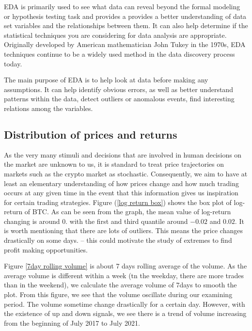 \documentclass[twoside]{report}
\begin{document}
\begin{spacing}{1}
EDA is primarily used to see what data can reveal beyond the formal modeling or hypothesis testing task and provides a provides a better understanding of data set variables and the relationships between them. It can also help determine if the statistical techniques you are considering for data analysis are appropriate. Originally developed by American mathematician John Tukey in the 1970s, EDA techniques continue to be a widely used method in the data discovery process today.

The main purpose of EDA is to help look at data before making any assumptions. It can help identify obvious errors, as well as better understand patterns within the data, detect outliers or anomalous events, find interesting relations among the variables.



\subsection{Distribution of prices and returns}

As the very many stimuli and decisions that are involved in human decisions on the market are unknown to us, it is standard to treat price trajectories on markets such as the crypto market as stochastic. Consequently, we aim to have at least an elementary understanding of how prices change and how much trading occurs at any given time in the event that this information gives us inspiration for certain trading strategies. Figure (\ref{log return box}) shows the box plot of log-return of BTC. As can be seen from the graph, the mean value of log-return changing is around 0. with the first and third quantile around $-0.02$ and $0.02$. It is worth mentioning that there are lots of outliers. This means the price changes drastically on some days. -- this could motivate the study of extremes to find profit making opportunities. 

Figure \ref{7day rolling volume} is about 7 days rolling average of the volume. As the average volume is different within a week (tn the weekday, there are more trades than in the weekend), we calculate the average volume of 7days to smooth the plot. From this figure, we see that the volume oscillate during our examining period. The volume sometime change drastically for a certain day. However, with the existence of up and down signals, we see there is a trend of volume increasing from the beginning of July 2017 to July 2021.



\end{spacing}
\end{document}
